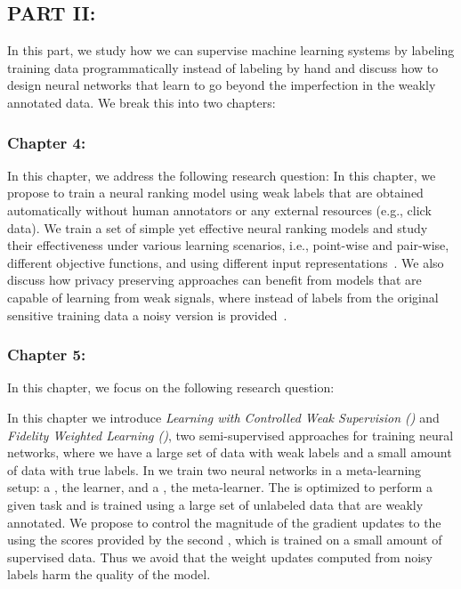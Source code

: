 \subsection*{PART II: }
In this part, we study how we can supervise machine learning systems by labeling training data programmatically instead of labeling by hand and discuss how to design neural networks that learn to go beyond the imperfection in the weakly annotated data. We break this into two chapters:

\subsubsection*{Chapter 4: }
In this chapter, we address the following research question:
In this chapter, we propose to train a neural ranking model using weak labels that are obtained automatically without human annotators or any external resources (e.g., click data). We train a set of simple yet effective neural ranking models and study their effectiveness under various learning scenarios, i.e., point-wise and pair-wise, different objective functions, and using different input representations~\citep{Dehghani:2017:SIGIR}. We also discuss how privacy preserving approaches can benefit from models that are capable of learning from weak signals, where instead of labels from the original sensitive training data a noisy version is provided~\citep{dehghani:2017:neuir}.

\subsubsection*{Chapter 5: }
In this chapter, we focus on the following research question:

In this chapter we introduce \emph{Learning with Controlled Weak Supervision (\cws)} and \emph{Fidelity Weighted Learning (\fwl)}, two semi-supervised approaches for training neural networks, where we have a large set of data with weak labels and a small amount of data with true labels. 
%
In \cws we train two neural networks in a meta-learning setup: a \tnet, the learner, and a \cnet, the meta-learner.  The \tnet is optimized to perform a given task and is trained using a large set of unlabeled data that are weakly annotated. We propose to control the magnitude of the gradient updates to the \tnet using the scores provided by the second \cnet, which is trained on a small amount of supervised data. Thus we avoid that the weight updates computed from noisy labels harm the quality of the \tnet model.

